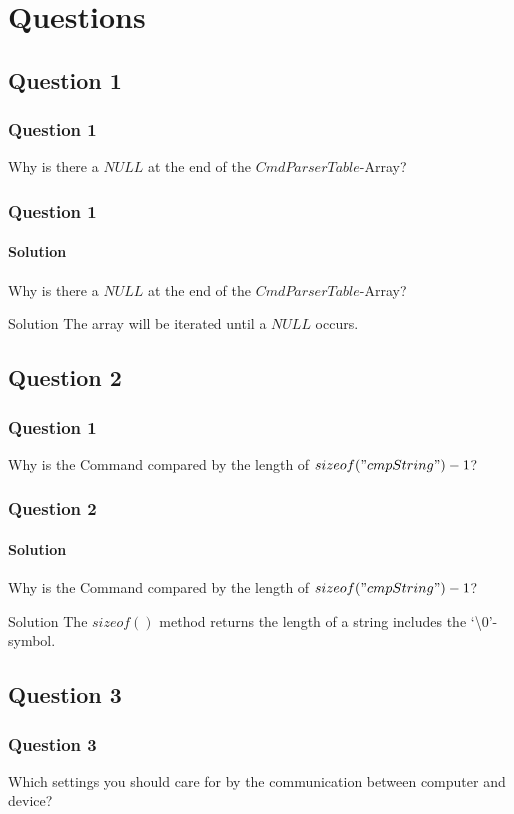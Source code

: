\section{Questions}
\subsection*{Question 1}
\begin{frame}
    \frametitle{Question 1}
    \begin{large}
    	Why is there a $NULL$ at the end of the $CmdParserTable$-Array?
    \end{large}
\end{frame}

\begin{frame}
    \frametitle{Question 1}
    \framesubtitle{Solution}
    \begin{large}
    	Why is there a $NULL$ at the end of the $CmdParserTable$-Array?
    \end{large}
    \begin{block}{Solution}
    	The array will be iterated until a $NULL$ occurs.
    \end{block}
\end{frame}

\subsection*{Question 2}
\begin{frame}
    \frametitle{Question 1}
    \begin{large}
    	Why is the Command compared by the length of $sizeof("cmpString")-1$?
    \end{large}
\end{frame}

\begin{frame}
    \frametitle{Question 2}
    \framesubtitle{Solution}
    \begin{large}
       	Why is the Command compared by the length of $sizeof("cmpString")-1$?
    \end{large}
    \begin{block}{Solution}
    	The $sizeof()$ method returns the length of a string includes the \textquoteleft\textbackslash 0\textquoteright-symbol.
    \end{block}
\end{frame}

\subsection*{Question 3}
\begin{frame}
    \frametitle{Question 3}
    \begin{large}
    	Which settings you should care for by the communication between computer and device?
    \end{large}
\end{frame}

